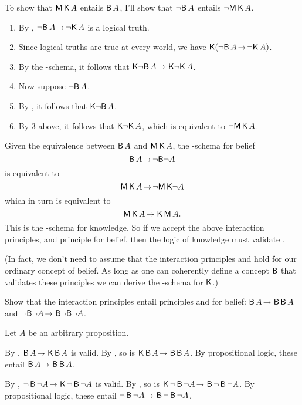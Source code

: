 To show that $\operatorname{\mathsf{M}}\operatorname{\mathsf{K}{}} A$ entails $\operatorname{\mathsf{B}} A$, I'll show that $\neg\! \operatorname{\mathsf{B}} A$
entails $\neg\! \operatorname{\mathsf{M}}\operatorname{\mathsf{K}{}} A$.
%
\begin{enumerate}[leftmargin=10mm]
  \itemsep-1mm
\item By , $\neg\! \Bel A \to \neg\! \Kn A$ is a logical truth.
\item Since logical truths are true at every world, we have $\Kn(\neg\! \Bel A \to \neg\! \Kn A)$.
\item By the -schema, it follows that $\Kn\!\neg\! \Bel A \to \Kn \!\neg\! \Kn A$.
\item Now suppose $\neg\! \operatorname{\mathsf{B}} A$.
\item By , it follows that $\operatorname{\mathsf{K}{}} \!\neg\! \operatorname{\mathsf{B}} A$.
\item By 3 above, it follows that $\operatorname{\mathsf{K}{}}\! \neg\! \operatorname{\mathsf{K}{}} A$, which is equivalent to $\neg\! \operatorname{\mathsf{M}}\operatorname{\mathsf{K}{}} A$.
\end{enumerate}

Given the equivalence between $\operatorname{\mathsf{B}} A$ and $\operatorname{\mathsf{M}}\operatorname{\mathsf{K}{}} A$, the -schema for
belief
\[
  \Bel A \to \neg\! \Bel\!\neg A
\]
is equivalent to
\[
  \Mi \Kn A \to \neg\!\Mi\Kn\! \neg A
\]
which in turn is equivalent to
\[
  \Mi \Kn A \to \Kn\Mi A.
\]
This is the -schema for knowledge. So if we accept the above interaction
principles, and principle  for belief, then the logic of knowledge must
validate .

(In fact, we don't need to assume that the interaction principles and 
hold for our ordinary concept of belief. As long as one can coherently define a
concept $\operatorname{\mathsf{B}}$ that validates these principles we can derive the -schema
for $\operatorname{\mathsf{K}{}}$.)

\begin{exercise}
  Show that the interaction principles entail principles  and  for
  belief: $\Bel A \to \Bel\Bel A$ and $\neg\!\Bel\!\neg A \to \Bel\!\neg\!\Bel\!\neg A$.
\end{exercise}
\begin{solution}
  Let $A$ be an arbitrary proposition.

  By , $\Bel A \to \Kn\Bel A$ is valid. By , so is
  $\Kn\Bel A \to \Bel\Bel A$. By propositional logic, these entail
  $\Bel A \to \Bel\Bel A$.

  By , $\neg \Bel \neg A \to \Kn\neg \Bel \neg A$ is valid. By ,
  so is $\Kn\neg \Bel \neg A \to \Bel\neg \Bel \neg A$. By propositional logic,
  these entail $\neg \Bel \neg A \to \Bel\neg \Bel \neg A$.
\end{solution}

